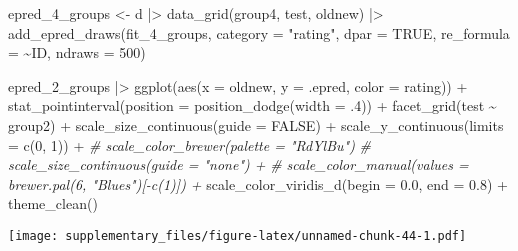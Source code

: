 \documentclass[
  man,floatsintext]{apa7}
\newenvironment{Shaded}{\begin{snugshade}}{\end{snugshade}}
\newcommand{\AttributeTok}[1]{\textcolor[rgb]{0.77,0.63,0.00}{#1}}
\newcommand{\CommentTok}[1]{\textcolor[rgb]{0.56,0.35,0.01}{\textit{#1}}}
\newcommand{\ConstantTok}[1]{\textcolor[rgb]{0.00,0.00,0.00}{#1}}
\newcommand{\DecValTok}[1]{\textcolor[rgb]{0.00,0.00,0.81}{#1}}
\newcommand{\FloatTok}[1]{\textcolor[rgb]{0.00,0.00,0.81}{#1}}
\newcommand{\FunctionTok}[1]{\textcolor[rgb]{0.00,0.00,0.00}{#1}}
\newcommand{\NormalTok}[1]{#1}
\newcommand{\OtherTok}[1]{\textcolor[rgb]{0.56,0.35,0.01}{#1}}
\newcommand{\SpecialCharTok}[1]{\textcolor[rgb]{0.00,0.00,0.00}{#1}}
\newcommand{\StringTok}[1]{\textcolor[rgb]{0.31,0.60,0.02}{#1}}
\begin{document}
\begin{Shaded}
\begin{Highlighting}[]
\NormalTok{epred\_4\_groups }\OtherTok{\textless{}{-}}\NormalTok{ d }\SpecialCharTok{|\textgreater{}}
  \FunctionTok{data\_grid}\NormalTok{(group4, test, oldnew) }\SpecialCharTok{|\textgreater{}}
  \FunctionTok{add\_epred\_draws}\NormalTok{(fit\_4\_groups,}
                  \AttributeTok{category =} \StringTok{"rating"}\NormalTok{,}
                  \AttributeTok{dpar =} \ConstantTok{TRUE}\NormalTok{,}
                  \AttributeTok{re\_formula =} \SpecialCharTok{\textasciitilde{}}\NormalTok{ID,}
                  \AttributeTok{ndraws =} \DecValTok{500}\NormalTok{)}
\end{Highlighting}
\end{Shaded}

\begin{Shaded}
\begin{Highlighting}[]
\NormalTok{epred\_2\_groups }\SpecialCharTok{|\textgreater{}}
  \FunctionTok{ggplot}\NormalTok{(}\FunctionTok{aes}\NormalTok{(}\AttributeTok{x =}\NormalTok{ oldnew, }\AttributeTok{y =}\NormalTok{ .epred, }\AttributeTok{color =}\NormalTok{ rating)) }\SpecialCharTok{+}
  \FunctionTok{stat\_pointinterval}\NormalTok{(}\AttributeTok{position =} \FunctionTok{position\_dodge}\NormalTok{(}\AttributeTok{width =}\NormalTok{ .}\DecValTok{4}\NormalTok{)) }\SpecialCharTok{+}
  \FunctionTok{facet\_grid}\NormalTok{(test }\SpecialCharTok{\textasciitilde{}}\NormalTok{ group2) }\SpecialCharTok{+}
  \FunctionTok{scale\_size\_continuous}\NormalTok{(}\AttributeTok{guide =} \ConstantTok{FALSE}\NormalTok{) }\SpecialCharTok{+}
  \FunctionTok{scale\_y\_continuous}\NormalTok{(}\AttributeTok{limits =} \FunctionTok{c}\NormalTok{(}\DecValTok{0}\NormalTok{, }\DecValTok{1}\NormalTok{)) }\SpecialCharTok{+}
  \CommentTok{\# scale\_color\_brewer(palette = "RdYlBu")}
  \CommentTok{\# scale\_size\_continuous(guide = "none") +}
  \CommentTok{\# scale\_color\_manual(values = brewer.pal(6, "Blues")[{-}c(1)]) +}
  \FunctionTok{scale\_color\_viridis\_d}\NormalTok{(}\AttributeTok{begin =} \FloatTok{0.0}\NormalTok{, }\AttributeTok{end =} \FloatTok{0.8}\NormalTok{) }\SpecialCharTok{+}
  \FunctionTok{theme\_clean}\NormalTok{()}
\end{Highlighting}
\end{Shaded}

\texttt{[image: supplementary\_files/figure-latex/unnamed-chunk-44-1.pdf]}
\end{document}
